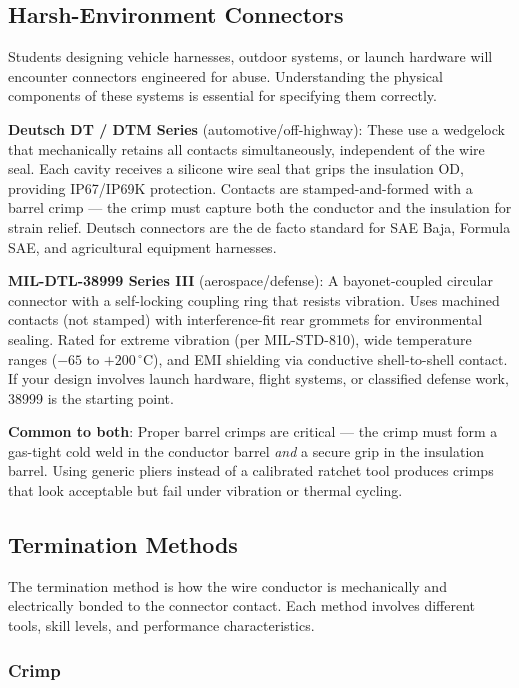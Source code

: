 \documentclass[11pt,letterpaper,twoside,openany]{book}
\newcommand{\degC}{\ensuremath{{}^{\circ}\text{C}}}
\begin{document}
\subsection{Harsh-Environment Connectors}

Students designing vehicle harnesses, outdoor systems, or launch hardware will encounter connectors engineered for abuse. Understanding the physical components of these systems is essential for specifying them correctly.

\textbf{Deutsch DT / DTM Series} (automotive/off-highway): These use a wedgelock that mechanically retains all contacts simultaneously, independent of the wire seal. Each cavity receives a silicone wire seal that grips the insulation OD, providing IP67/IP69K protection. Contacts are stamped-and-formed with a barrel crimp --- the crimp must capture both the conductor and the insulation for strain relief. Deutsch connectors are the de facto standard for SAE Baja, Formula SAE, and agricultural equipment harnesses.

\textbf{MIL-DTL-38999 Series III} (aerospace/defense): A bayonet-coupled circular connector with a self-locking coupling ring that resists vibration. Uses machined contacts (not stamped) with interference-fit rear grommets for environmental sealing. Rated for extreme vibration (per MIL-STD-810), wide temperature ranges ($-65$ to $+200$\,\degC), and EMI shielding via conductive shell-to-shell contact. If your design involves launch hardware, flight systems, or classified defense work, 38999 is the starting point.

\textbf{Common to both}: Proper barrel crimps are critical --- the crimp must form a gas-tight cold weld in the conductor barrel \emph{and} a secure grip in the insulation barrel. Using generic pliers instead of a calibrated ratchet tool produces crimps that look acceptable but fail under vibration or thermal cycling.


\subsection{Termination Methods}
\label{sec:termination}

The termination method is how the wire conductor is mechanically and electrically bonded to the connector contact. Each method involves different tools, skill levels, and performance characteristics.

\subsubsection{Crimp}
\end{document}
